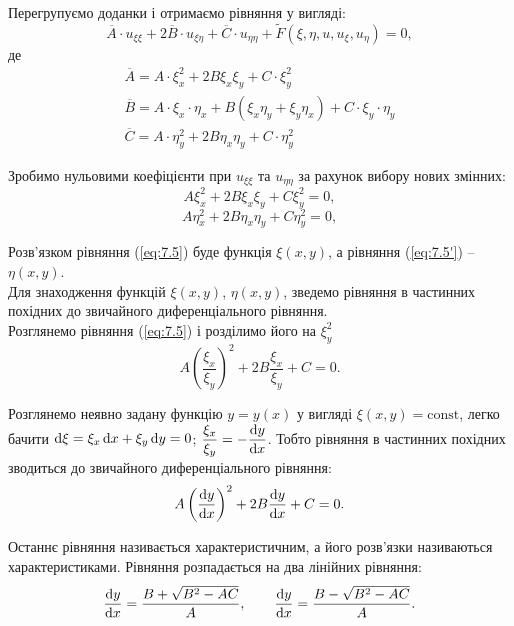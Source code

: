 Перегрупуємо доданки і отримаємо рівняння у вигляді:
\begin{equation}
	\label{eq:7.4}
	\overline{A} \cdot u_{\xi\xi} + 2\overline{B}\cdot u_{\xi\eta} + \overline{C} \cdot u_{\eta\eta} + \widetilde{F}(\xi,\eta,u,u_\xi,u_\eta)=0,
\end{equation}
де 
\begin{multline*}
	\overline{A} = A \cdot \xi_x^2 + 2 B \xi_x \xi_y + C \cdot \xi_y^2 \\
	\overline{B} = A \cdot \xi_x \cdot \eta_x + B(\xi_x \eta_y + \xi_y \eta_x) + C \cdot \xi_y \cdot \eta_y \\
	\overline{C} = A \cdot \eta_y^2 + 2 B \eta_x \eta_y + C \cdot \eta_y^2
\end{multline*}

Зробимо нульовими коефіцієнти при $u_{\xi\xi}$ та $u_{\eta\eta}$ за рахунок вибору нових змінних:
\begin{equation}
	\label{eq:7.5}
	A \xi_x^2 + 2 B \xi_x \xi_y + C \xi_y^2 = 0,
\end{equation}
\begin{equation}
	\label{eq:7.5'}
	A \eta_x^2 + 2 B \eta_x \eta_y + C \eta_y^2 = 0,
\end{equation}

Розв’язком рівняння (\ref{eq:7.5}) буде функція $\xi(x,y)$, а рівняння (\ref{eq:7.5'}) -- $\eta(x,y)$. \\

Для знаходження функцій $\xi(x, y)$, $\eta(x,y)$, зведемо рівняння в частинних похідних до звичайного диференціального рівняння. \\

Розглянемо рівняння (\ref{eq:7.5}) і розділимо його на $\xi_y^2$
\begin{equation}
	\label{eq:7.6}
	A \left( \dfrac{\xi_x}{\xi_y} \right)^2 + 2 B \dfrac{\xi_x}{\xi_y} + C = 0.
\end{equation}

Розглянемо неявно задану функцію $y = y(x)$ у вигляді $\xi(x, y) = \text{const}$, легко бачити $\mathop{}\!\mathrm{d} \xi = \xi_x \mathop{}\!\mathrm{d} x + \xi_y \mathop{}\!\mathrm{d} y = 0$; $\dfrac{\xi_x}{\xi_y} = - \dfrac{\mathop{}\!\mathrm{d} y}{\mathop{}\!\mathrm{d} x}$. Тобто рівняння в частинних похідних зводиться до звичайного диференціального рівняння:
\begin{equation}
	\label{eq:7.7}
	A \left( \dfrac{\mathop{}\!\mathrm{d} y}{\mathop{}\!\mathrm{d} x} \right)^2 + 2 B \dfrac{\mathop{}\!\mathrm{d} y}{\mathop{}\!\mathrm{d} x} + C = 0.
\end{equation}

Останнє рівняння називається характеристичним, а його розв’язки називаються характеристиками. Рівняння розпадається на два лінійних рівняння:
\begin{equation}
	\label{eq:7.8}
	\dfrac{\mathop{}\!\mathrm{d} y}{\mathop{}\!\mathrm{d} x} = \dfrac{B + \sqrt{B^2 - AC}}{A}, \qquad \dfrac{\mathop{}\!\mathrm{d} y}{\mathop{}\!\mathrm{d} x} = \dfrac{B - \sqrt{B^2 - AC}}{A}.
\end{equation}

